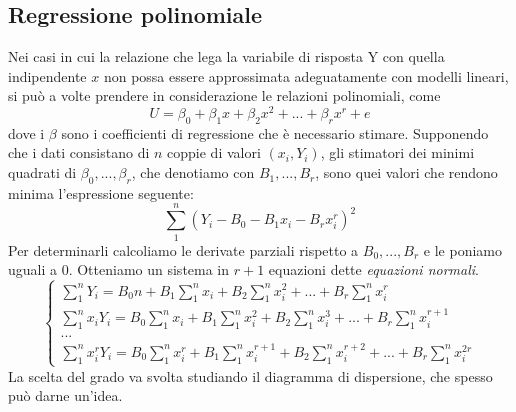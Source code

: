 \documentclass[11pt]{article}
\begin{document}
\subsection{Regressione polinomiale}
Nei casi in cui la relazione che lega la variabile di risposta Y con quella indipendente $x$ non possa essere approssimata adeguatamente con modelli lineari, si può a volte prendere in considerazione le relazioni polinomiali, come
\begin{displaymath}
    U=\beta_0 + \beta_1 x + \beta_2x^2+...+\beta_rx^r+e
\end{displaymath}
dove i $\beta$ sono i coefficienti di regressione che è necessario stimare. Supponendo che i dati consistano di $n$ coppie di valori $(x_i,Y_i)$, gli stimatori dei minimi quadrati di $\beta_0,...,\beta_r$, che denotiamo con $B_1,...,B_r$, sono quei valori che rendono minima l'espressione seguente:
\begin{displaymath}
    \sum_1^n (Y_i-B_0-B_1x_i-B_rx_i^r)^2
\end{displaymath} 
Per determinarli calcoliamo le derivate parziali rispetto a $B_0,...,B_r$ e le poniamo uguali a 0. Otteniamo un sistema in $r+1$ equazioni dette \textit{equazioni normali}.
\begin{displaymath}
    \begin{cases}
        \sum_1^n Y_i = B_0n+B_1\sum_1^n x_i + B_2\sum_1^n x_i^2+...+B_r\sum_1^n x_i^r\\ 
        \sum_1^n x_iY_i = B_0\sum_1^n x_i+B_1\sum_1^n x_i^2 + B_2\sum_1^n x_i^3+...+B_r\sum_1^n x_i^{r+1}\\ 
        ...\\
        \sum_1^n x_i^rY_i = B_0\sum_1^n x_i^r+B_1\sum_1^n x_i^{r+1} + B_2\sum_1^n x_i^{r+2}+...+B_r\sum_1^n x_i^{2r} 
    \end{cases}
\end{displaymath}
La scelta del grado va svolta studiando il diagramma di dispersione, che spesso può darne un'idea.
\end{document}
